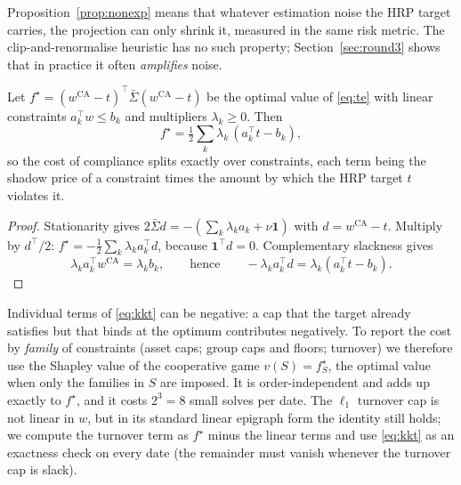 Proposition~\ref{prop:nonexp} means that whatever estimation noise the HRP target carries,
the projection can only shrink it, measured in the same risk metric. The clip-and-renormalise
heuristic has no such property; Section~\ref{sec:round3} shows that in practice it often
\emph{amplifies} noise.

\begin{proposition}\label{prop:kkt}
Let $f^\star=(w^{\mathrm{CA}}-t)^\top\bar\Sigma(w^{\mathrm{CA}}-t)$ be the optimal value of
\eqref{eq:te} with linear constraints $a_k^\top w\le b_k$ and multipliers
$\lambda_k\ge0$. Then
\begin{equation}\label{eq:kkt}
f^\star=\tfrac12\sum_k\lambda_k\,(a_k^\top t-b_k),
\end{equation}
so the cost of compliance splits exactly over constraints, each term being the shadow price
of a constraint times the amount by which the HRP target $t$ violates it.
\end{proposition}
\begin{proof}
Stationarity gives $2\bar\Sigma d=-(\sum_k\lambda_k a_k+\nu\mathbf1)$ with $d=w^{\mathrm{CA}}-t$.
Multiply by $d^\top/2$: $f^\star=-\tfrac12\sum_k\lambda_k a_k^\top d$, because
$\mathbf1^\top d=0$. Complementary slackness gives
\[
\lambda_k a_k^\top w^{\mathrm{CA}}=\lambda_k b_k,\qquad\text{hence}\qquad
-\lambda_k a_k^\top d=\lambda_k(a_k^\top t-b_k).
\]
\end{proof}

Individual terms of \eqref{eq:kkt} can be negative: a cap that the target already satisfies
but that binds at the optimum contributes negatively. To report the cost by \emph{family} of
constraints (asset caps; group caps and floors; turnover) we therefore use the Shapley value \citep{shapley1953}
of the cooperative game $v(S)=f^\star_S$, the optimal value when only the families in $S$
are imposed. It is order-independent and adds up exactly to $f^\star$, and it costs $2^3=8$
small solves per date. The $\ell_1$ turnover cap is not linear in $w$, but in its standard
linear epigraph form the identity still holds; we compute the turnover term as
$f^\star$ minus the linear terms and use \eqref{eq:kkt} as an exactness check on every date
(the remainder must vanish whenever the turnover cap is slack).

